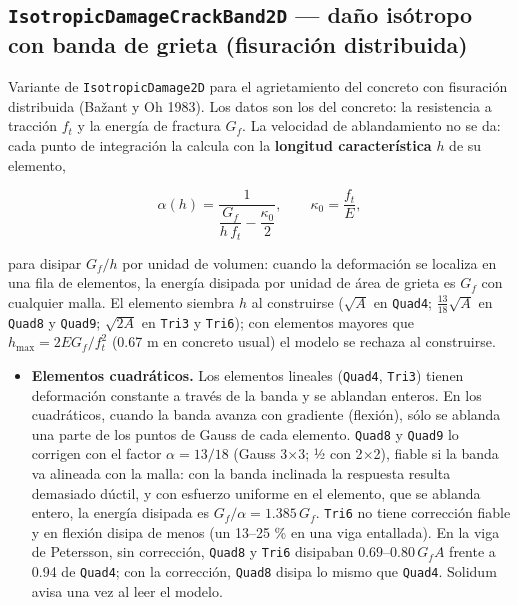 \documentclass[11pt,oneside]{report}
\begin{document}
\subsection{\texttt{IsotropicDamageCrackBand2D} --- daño isótropo con banda de grieta (fisuración distribuida)}

Variante de \texttt{IsotropicDamage2D} para el agrietamiento del concreto con fisuración distribuida (Bažant y Oh 1983). Los datos son los del concreto: la resistencia a tracción $f_t$ y la energía de fractura $G_f$. La velocidad de ablandamiento no se da: cada punto de integración la calcula con la \textbf{longitud característica} $h$ de su elemento,

\[
\alpha(h) = \frac{1}{\dfrac{G_f}{h\,f_t} - \dfrac{\kappa_0}{2}}, \qquad \kappa_0 = \frac{f_t}{E},
\]

para disipar $G_f/h$ por unidad de volumen: cuando la deformación se localiza en una fila de elementos, la energía disipada por unidad de área de grieta es $G_f$ con cualquier malla. El elemento siembra $h$ al construirse ($\sqrt{A}$ en \texttt{Quad4}; $\tfrac{13}{18}\sqrt{A}$ en \texttt{Quad8} y \texttt{Quad9}; $\sqrt{2A}$ en \texttt{Tri3} y \texttt{Tri6}); con elementos mayores que $h_\text{max} = 2EG_f/f_t^2$ (0.67 m en concreto usual) el modelo se rechaza al construirse.

\begin{itemize}
  \item \textbf{Elementos cuadráticos.} Los elementos lineales (\texttt{Quad4}, \texttt{Tri3}) tienen deformación constante a través de la banda y se ablandan enteros. En los cuadráticos, cuando la banda avanza con gradiente (flexión), sólo se ablanda una parte de los puntos de Gauss de cada elemento. \texttt{Quad8} y \texttt{Quad9} lo corrigen con el factor $\alpha = 13/18$ (Gauss 3\ensuremath{\times}3; ½ con 2\ensuremath{\times}2), fiable si la banda va alineada con la malla: con la banda inclinada la respuesta resulta demasiado dúctil, y con esfuerzo uniforme en el elemento, que se ablanda entero, la energía disipada es $G_f/\alpha = 1.385\,G_f$. \texttt{Tri6} no tiene corrección fiable y en flexión disipa de menos (un 13--25 \% en una viga entallada). En la viga de Petersson, sin corrección, \texttt{Quad8} y \texttt{Tri6} disipaban $0.69$--$0.80\,G_fA$ frente a 0.94 de \texttt{Quad4}; con la corrección, \texttt{Quad8} disipa lo mismo que \texttt{Quad4}. Solidum avisa una vez al leer el modelo.
\end{itemize}
\end{document}
